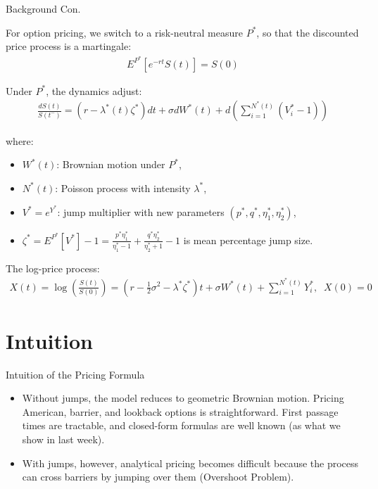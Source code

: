 \documentclass{beamer}
\begin{document}
\begin{frame}{Background Con.}

    {\footnotesize \footnotesize
    \par For option pricing, we switch to a risk-neutral measure \( P^* \), so that the discounted price process is a martingale:
    \begin{align*}
        E^{P^*}[e^{-rt}S(t)] = S(0)
    \end{align*}
    \par Under \( P^* \), the dynamics adjust:
    \begin{align*}
        \frac{dS(t)}{S(t^-)} = (r - \lambda^*(t)\zeta^*)dt + \sigma dW^*(t) + d\left(\sum_{i=1}^{N^*(t)}(V_i^*-1)\right)
    \end{align*}
    \par where:
    \begin{itemize}
        \item \( W^*(t) \): Brownian motion under \( P^* \),
        \item \( N^*(t) \): Poisson process with intensity \( \lambda^* \),
        \item \( V^* = e^{Y^*} \): jump multiplier with new parameters \( (p^*, q^*, \eta_1^*, \eta_2^*) \),
        \item \( \zeta^* = E^{P^*}[V^*] - 1 = \frac{p^{*}\eta_{1}^{*}}{\eta_{1}^{*}-1} + \frac{q^{*}\eta_{2}^{*}}{\eta_{2}^{*}+1} - 1\) is mean percentage jump size.
    \end{itemize}
    \par The log-price process:  
    \begin{align*}
        X(t) = \log\left(\frac{S(t)}{S(0)}\right) = \left(r - \frac{1}{2}\sigma^2 - 
    \lambda^*\zeta^*\right)t + \sigma W^*(t) + \sum_{i=1}^{N^*(t)} Y_i^*,\;\;X(0)=0
    \end{align*}
    }
    
    
\end{frame}


\section{Intuition}
\begin{frame}{Intuition of the Pricing Formula}

    \begin{itemize}
    \item Without jumps, the model reduces to geometric Brownian motion. Pricing American, 
    barrier, and lookback options is straightforward. First passage times are tractable, and 
    closed-form formulas are well known (as what we show in last week).
    \vspace{1em}
    \item With jumps, however, analytical pricing becomes difficult 
    because the process can cross barriers by jumping over them (Overshoot Problem).
\end{itemize}
    
\end{frame}
\end{document}
